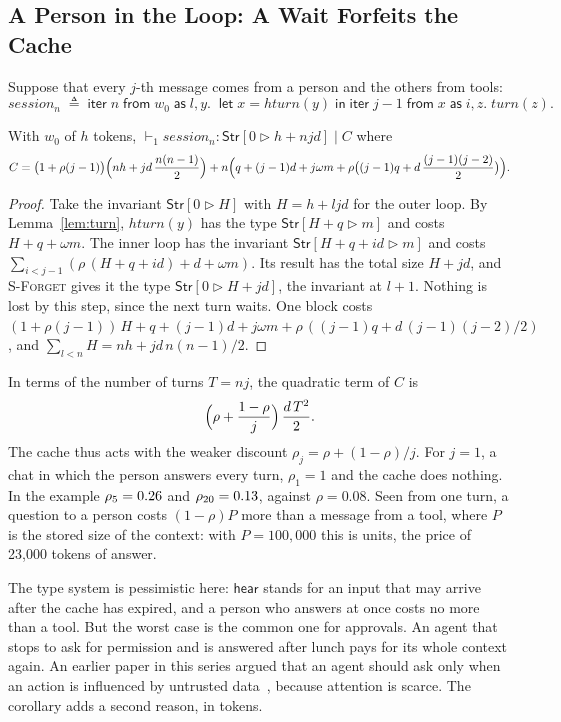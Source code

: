 \documentclass[acmsmall,nonacm,screen]{acmart}
\newcommand{\kw}[1]{\mathsf{#1}}
\newcommand{\Str}[2]{\kw{Str}[#1 \triangleright #2]}
\newcommand{\letin}[2]{\kw{let}\;#1 = #2\;\kw{in}}
\newcommand{\iter}[4]{\kw{iter}\;#1\;\kw{from}\;#2\;\kw{as}\;#3.\;#4}
\newcommand{\nm}[1]{\mathit{#1}}
\newcommand{\turn}{\nm{turn}}
\newcommand{\hturn}{\nm{hturn}}
\newcommand{\defeq}{\;\triangleq\;}
\begin{document}
\subsection{A Person in the Loop: A Wait Forfeits the Cache}
\label{sec:human}

Suppose that every $j$-th message comes from a person and the others from tools:
\[
\nm{session}_n \defeq \iter{n}{w_0}{l, y}{\;\letin{x}{\hturn(y)}\; \iter{j-1}{x}{i,z}{\turn(z)}} .
\]

\begin{corollary}
\label{cor:human}
With $w_0$ of $h$ tokens, $\vdash_1 \nm{session}_n : \Str{0}{h + njd} \mid C$ where
\[
C = \bigl(1 + \rho(j-1)\bigr)\Bigl(nh + jd\,\frac{n(n-1)}{2}\Bigr)
  + n\Bigl(q + (j-1)d + j\omega m + \rho\bigl((j-1)q + d\,\frac{(j-1)(j-2)}{2}\bigr)\Bigr) .
\]
\end{corollary}

\begin{proof}
Take the invariant $\Str{0}{H}$ with $H = h + ljd$ for the outer loop. By
Lemma~\ref{lem:turn}, $\hturn(y)$ has the type $\Str{H+q}{m}$ and costs
$H + q + \omega m$. The inner loop has the invariant $\Str{H + q + id}{m}$ and costs
$\sum_{i<j-1} (\rho\,(H + q + id) + d + \omega m)$. Its result has the total size
$H + jd$, and \textsc{S-Forget} gives it the type $\Str{0}{H + jd}$, the invariant at
$l + 1$. Nothing is lost by this step, since the next turn waits. One block costs
$(1 + \rho(j-1))\,H + q + (j-1)d + j\omega m + \rho\,((j-1)q + d\,(j-1)(j-2)/2)$, and
$\sum_{l<n} H = nh + jd\,n(n-1)/2$.
\end{proof}

In terms of the number of turns $T = nj$, the quadratic term of $C$ is
\[
\Bigl(\rho + \frac{1-\rho}{j}\Bigr)\,\frac{d\,T^2}{2} .
\]
The cache thus acts with the weaker discount $\rho_j = \rho + (1-\rho)/j$. For $j = 1$, a
chat in which the person answers every turn, $\rho_1 = 1$ and the cache does nothing. In the
example $\rho_5 = 0.26$ and $\rho_{20} = 0.13$, against $\rho = 0.08$. Seen from
one turn, a question to a person costs $(1-\rho)P$ more than a message from a tool, where $P$
is the stored size of the context: with $P = 100{,}000$ this is \exQuestion{} units, the price
of 23,000 tokens of answer.

The type system is pessimistic here: $\kw{hear}$ stands for an input that may arrive after the
cache has expired, and a person who answers at once costs no more than a tool. But the worst
case is the common one for approvals. An agent that stops to ask for permission and is
answered after lunch pays for its whole context again. An earlier paper in this series argued
that an agent should ask only when an action is influenced by untrusted
data~\cite{tpp5}, because attention is scarce. The corollary adds a second reason, in tokens.
\end{document}
